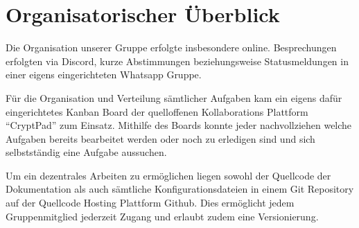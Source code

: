 \section{Organisatorischer Überblick}

Die Organisation unserer Gruppe erfolgte insbesondere online. Besprechungen erfolgten via Discord, kurze Abstimmungen beziehungsweise Statusmeldungen in einer eigens eingerichteten Whatsapp Gruppe.

Für die Organisation und Verteilung sämtlicher Aufgaben kam ein eigens dafür eingerichtetes Kanban Board der quelloffenen Kollaborations Plattform \enquote{CryptPad} zum Einsatz. Mithilfe des Boards konnte jeder nachvollziehen welche Aufgaben bereits bearbeitet werden oder noch zu erledigen sind und sich selbstständig eine Aufgabe aussuchen.

Um ein dezentrales Arbeiten zu ermöglichen liegen sowohl der Quellcode der Dokumentation als auch sämtliche Konfigurationsdateien in einem Git Repository auf der Quellcode Hosting Plattform Github. Dies ermöglicht jedem Gruppenmitglied jederzeit Zugang und erlaubt zudem eine Versionierung.